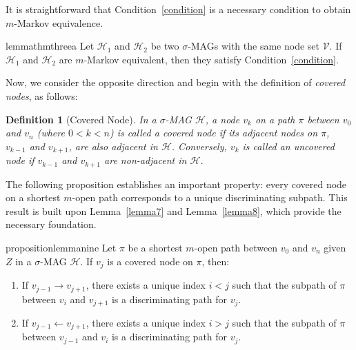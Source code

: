 \documentclass[accepted]{uai2025} %
\newtheorem{definition}{Definition}
\begin{document}
It is straightforward that Condition~\ref{condition} is a necessary condition to obtain $m$-Markov equivalence.

\begin{restatable}{lemma}{thmthreea} \label{thm3a}
Let $\mathcal{H}_1$ and $\mathcal{H}_2$ be two $\sigma$-MAGs with the same node set $\mathcal{V}$. If $\mathcal{H}_1$ and $\mathcal{H}_2$ are $m$-Markov equivalent, then they satisfy Condition~\ref{condition}.
\end{restatable}

Now, we consider the opposite direction and begin with the definition of \emph{covered nodes}, as follows:

\begin{definition} [Covered Node]  
In a \( \sigma \)-MAG \( \mathcal{H} \), a node \( v_k \) on a path \( \pi \) between \( v_0 \) and \( v_n \) (where \( 0 < k < n \)) is called a \emph{covered node} if its adjacent nodes on \( \pi \), \( v_{k-1} \) and \( v_{k+1} \), are also adjacent in \( \mathcal{H} \). Conversely, \( v_k \) is called an \emph{uncovered node} if \( v_{k-1} \) and \( v_{k+1} \) are non-adjacent in \( \mathcal{H} \).  
\end{definition}

The following proposition establishes an important property: every covered node on a shortest $m$-open path corresponds to a unique discriminating subpath. This result is built upon Lemma~\ref{lemma7} and Lemma~\ref{lemma8}, which provide the necessary foundation.

\begin{restatable}{proposition}{lemmanine} \label{lemma9}  
Let \( \pi \) be a shortest $m$-open path between \( v_0 \) and \( v_n \) given \( Z \) in a \( \sigma \)-MAG \( \mathcal{H} \). If \( v_j \) is a covered node on \( \pi \), then:  
\begin{enumerate}  
    \item If \( v_{j-1} \rightarrow v_{j+1} \), there exists a unique index \( i < j \) such that the subpath of $\pi$ between $v_i$ and $v_{j+1}$ is a discriminating path for \( v_j \).  
    \item If \( v_{j-1} \leftarrow v_{j+1} \), there exists a unique index \( i > j \) such that the subpath of $\pi$ between $v_{j-1}$ and $v_i$ is a discriminating path for \( v_j \).  
\end{enumerate}  
\end{restatable}  
\end{document}
